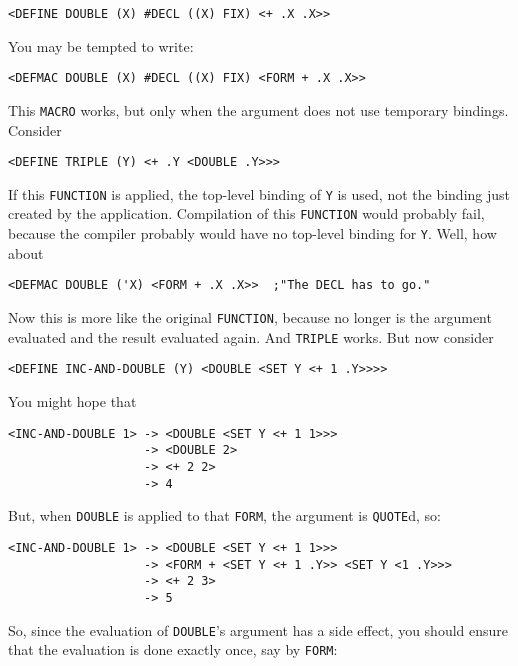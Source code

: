 \documentclass[a4paper]{scrbook}
\begin{document}
\begin{verbatim}
<DEFINE DOUBLE (X) #DECL ((X) FIX) <+ .X .X>>
\end{verbatim}

You may be tempted to write:

\begin{verbatim}
<DEFMAC DOUBLE (X) #DECL ((X) FIX) <FORM + .X .X>>
\end{verbatim}

This \texttt{MACRO} works, but only when the argument does not use temporary bindings. Consider

\begin{verbatim}
<DEFINE TRIPLE (Y) <+ .Y <DOUBLE .Y>>>
\end{verbatim}

If this \texttt{FUNCTION} is applied, the top-level binding of \texttt{Y} is used, not the binding just created by the
application. Compilation of this \texttt{FUNCTION} would probably fail, because the compiler probably would have no
top-level binding for \texttt{Y}. Well, how about

\begin{verbatim}
<DEFMAC DOUBLE ('X) <FORM + .X .X>>  ;"The DECL has to go."
\end{verbatim}

Now this is more like the original \texttt{FUNCTION}, because no longer is the argument evaluated and the result evaluated
again. And \texttt{TRIPLE} works. But now consider

\begin{verbatim}
<DEFINE INC-AND-DOUBLE (Y) <DOUBLE <SET Y <+ 1 .Y>>>>
\end{verbatim}

You might hope that

\begin{verbatim}
<INC-AND-DOUBLE 1> -> <DOUBLE <SET Y <+ 1 1>>>
                   -> <DOUBLE 2>
                   -> <+ 2 2>
                   -> 4
\end{verbatim}

But, when \texttt{DOUBLE} is applied to that \texttt{FORM}, the argument is \texttt{QUOTE}d, so:

\begin{verbatim}
<INC-AND-DOUBLE 1> -> <DOUBLE <SET Y <+ 1 1>>>
                   -> <FORM + <SET Y <+ 1 .Y>> <SET Y <1 .Y>>>
                   -> <+ 2 3>
                   -> 5
\end{verbatim}

So, since the evaluation of \texttt{DOUBLE}'s argument has a side effect, you should ensure that the evaluation is done
exactly once, say by \texttt{FORM}:
\end{document}
